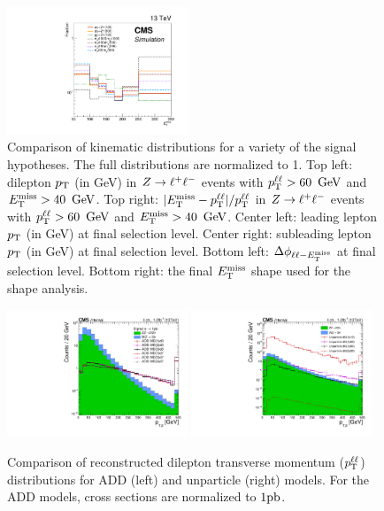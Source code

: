 \begin{figure}[htbp]
  \includegraphics[width=0.48\textwidth]{figures/signals_met.pdf}
  \caption{Comparison of kinematic distributions for a variety of the signal hypotheses. The full distributions are normalized to 1.
  Top left: dilepton $p_{\mathrm{T}}$ (in GeV) in $Z\to\ell^+\ell^-$ events with $p_{\mathrm{T}}^{\ell\ell} > 60~\,\text{Ge\hspace{-.08em}V}$ and $E_\mathrm{T}^{\mathrm{miss}} > 40~\,\text{Ge\hspace{-.08em}V}$. Top right: 
  $|E_\mathrm{T}^{\mathrm{miss}}-p_{\mathrm{T}}^{\ell\ell}|/p_{\mathrm{T}}^{\ell\ell}$ in $Z\to\ell^+\ell^-$ events with $p_{\mathrm{T}}^{\ell\ell} > 60~\,\text{Ge\hspace{-.08em}V}$ and $E_\mathrm{T}^{\mathrm{miss}} > 40~\,\text{Ge\hspace{-.08em}V}$.
  Center left: leading lepton $p_{\mathrm{T}}$ (in GeV) at final selection level. Center right: subleading lepton $p_{\mathrm{T}}$ (in GeV) at final selection level.
  Bottom left: $\Delta \phi_{\ell\ell-E_\mathrm{T}^{\mathrm{miss}}}$ at final selection level. Bottom right: the final $E_\mathrm{T}^{\mathrm{miss}}$ shape used for the shape analysis.}
  \label{fig:signals}
\end{figure}

\begin{figure}[htbp]
  \centering
  \includegraphics[width=0.48\textwidth]{figures/compare_add.pdf}
  \includegraphics[width=0.48\textwidth]{figures/compare_unparticle.pdf}
  \caption{
    Comparison of reconstructed dilepton transverse momentum ($p_{\mathrm{T}}^{\ell\ell}$) distributions for ADD (left) and unparticle (right) models.
    For the ADD models, cross sections are normalized to $1\mathrm{pb}$.
  }
  \label{fig:moreSignals}
\end{figure}

